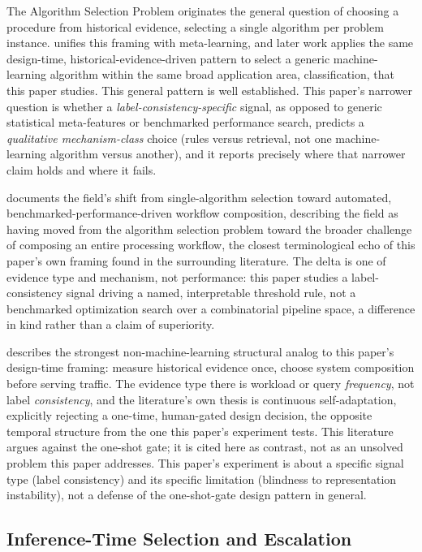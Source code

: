 \documentclass[11pt]{article}
\begin{document}
The Algorithm Selection Problem \citep{rice1976} originates the general
question of choosing a procedure from historical evidence, selecting a single
algorithm per problem instance. \citet{smithmiles2009} unifies this framing
with meta-learning, and later work applies the same design-time,
historical-evidence-driven pattern to select a generic machine-learning
algorithm within the same broad application area, classification, that this
paper studies. This general pattern is well established. This paper's
narrower question is whether a \emph{label-consistency-specific}
signal, as opposed to generic statistical meta-features or benchmarked
performance search, predicts a \emph{qualitative mechanism-class} choice
(rules versus retrieval, not one machine-learning algorithm versus another),
and it reports precisely where that narrower claim holds and where it fails.

\citet{barbudo2023} documents the field's shift from single-algorithm
selection toward automated, benchmarked-performance-driven workflow
composition, describing the field as having moved from the algorithm
selection problem toward the broader challenge of composing an entire
processing workflow, the closest terminological echo of this paper's own
framing found in the surrounding literature. The delta is one of evidence
type and mechanism, not performance: this paper studies a label-consistency signal driving a named,
interpretable threshold rule, not a benchmarked optimization search over a
combinatorial pipeline space, a difference in kind rather than a claim of
superiority.

\citet{idreoskraska2019} describes the strongest non-machine-learning
structural analog to this paper's design-time framing: measure historical
evidence once, choose system composition before serving traffic. The
evidence type there is workload or query \emph{frequency}, not label
\emph{consistency}, and the literature's own thesis is continuous
self-adaptation, explicitly rejecting a one-time, human-gated design
decision, the opposite temporal structure from the one this paper's
experiment tests. This literature argues against the one-shot gate; it is
cited here as contrast, not as an unsolved problem this paper addresses.
This paper's experiment is about a specific signal type
(label consistency) and its specific limitation (blindness to representation
instability), not a defense of the one-shot-gate design pattern in general.

\subsection{Inference-Time Selection and Escalation}
\label{sec:inference-time-selection}
\end{document}
